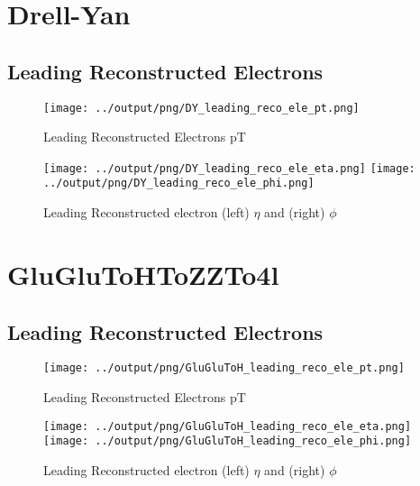 \documentclass[11pt]{book}
\begin{document}
\chapter{Drell-Yan}
\section{Leading Reconstructed Electrons}

\begin{figure}[ht]
\centering
\texttt{[image: ../output/png/DY\_leading\_reco\_ele\_pt.png]}
\caption{Leading Reconstructed Electrons pT}
\label{fig:dy_leading_reco_ele_pt}
\end{figure}

\begin{figure}[ht]
\centering
\texttt{[image: ../output/png/DY\_leading\_reco\_ele\_eta.png]}
\texttt{[image: ../output/png/DY\_leading\_reco\_ele\_phi.png]}
\caption{Leading Reconstructed electron (left) $\eta$ and (right) $\phi$}
\label{fig:dy_leading_reco_ele_eta_phi}
\end{figure}
\clearpage

\chapter{GluGluToHToZZTo4l}
\section{Leading Reconstructed Electrons}

\begin{figure}[ht]
\centering
\texttt{[image: ../output/png/GluGluToH\_leading\_reco\_ele\_pt.png]}
\caption{Leading Reconstructed Electrons pT}
\label{fig:gluglu_leading_reco_ele_pt}
\end{figure}

\begin{figure}[ht]
\centering
\texttt{[image: ../output/png/GluGluToH\_leading\_reco\_ele\_eta.png]}
\texttt{[image: ../output/png/GluGluToH\_leading\_reco\_ele\_phi.png]}
\caption{Leading Reconstructed electron (left) $\eta$ and (right) $\phi$}
\label{fig:gluglu_leading_reco_ele_eta_phi}
\end{figure}


 
\end{document}

